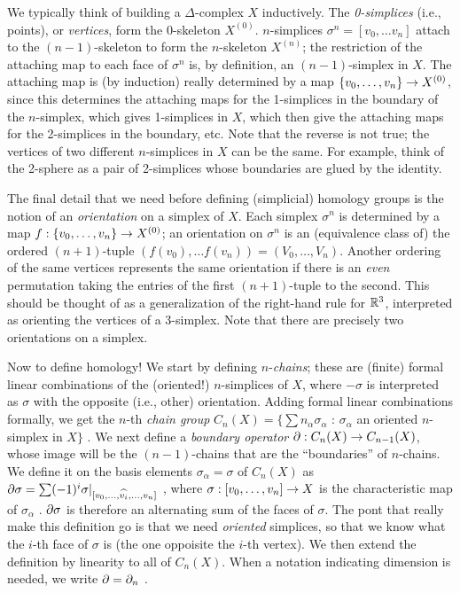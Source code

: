 \msk

We typically think of building a $\Delta$-complex $X$ inductively. 
The {\it 0-simplices}
(i.e., points), or {\it vertices}, form the 0-skeleton 
$X^{(0)}$. $n$-simplices $\sigma^n = [v_0,\ldots v_n]$ attach 
to the $(n-1)$-skeleton
to form the $n$-skeleton $X^{(n)}$; the restriction
of the attaching map to each face of $\sigma^n$ is, by definition,
an $(n-1)$-simplex in $X$. The attaching map is (by induction)
really determined by a map $\{v_0,\ldots ,v_n\}\rightarrow X^{(0)}$, since this 
determines the attaching maps for the 1-simplices in the boundary of the
$n$-simplex, which 
gives 1-simplices in $X$, which then give the attaching maps for
the 2-simplices in the boundary, etc. Note that the reverse is not true;
the vertices of two different $n$-simplices in $X$ can be the same.
For example, think of the 2-sphere as a pair of 2-simplices whose 
boundaries are glued by the identity. 

\msk

The final detail that we need before defining (simplicial) homology
groups is the notion of an {\it orientation} on a simplex of $X$.
Each simplex $\sigma^n$ is determined by a map 
$f:\{v_0,\ldots ,v_n\}\rightarrow X^{(0)}$; an orientation on $\sigma^n$ is an
(equivalence class of) the ordered $(n+1)$-tuple $(f(v_0),\ldots f(v_n)) = (V_0,\ldots ,V_n)$.
Another ordering of the
same vertices represents the same orientation if there is an {\it even} permutation
taking the entries of the first $(n+1)$-tuple to the second. This should be thought 
of as a generalization of the right-hand rule for ${\Bbb R}^3$, interpreted as
orienting the vertices of a 3-simplex. Note that there are precisely two
orientations on a simplex.

\msk

Now to define homology! We start by defining $n$-{\it chains};
these are (finite) formal linear combinations of the (oriented!) $n$-simplices
of $X$, where $-\sigma$ is interpreted as $\sigma$ with the opposite
(i.e., other) orientation. Adding formal linear combinations formally,
we get the $n$-th {\it chain group} 
$C_n(X) = \{\sum n_\alpha \sigma_\alpha$ : $\sigma_\alpha$ an oriented $n$-simplex in $X\}$ .
We next define a {\it boundary operator} $\partial:C_n(X)\rightarrow C_{n-1}(X)$, whose image will be 
the $(n-1)$-chains that are the ``boundaries'' of $n$-chains. We define it on the basis
elements $\sigma_\alpha = \sigma$ of $C_n(X)$ as
$\partial\sigma = \sum (-1)^i\sigma|_{[v_0,\ldots,\widehat{v_{i}},\ldots ,v_n]}$ , 
where $\sigma:[v_0,\ldots ,v_n]\rightarrow X$ is the characteristic map of $\sigma_\alpha$ .
$\partial\sigma$ is therefore an alternating sum of the faces of $\sigma$. 
The pont that really make this definition
go is that we need {\it oriented} simplices, so that we know what the $i$-th face
of $\sigma$ is (the one oppoisite the $i$-th vertex).
We then extend the definition by linearity to all of $C_n(X)$. When a notation indicating
dimension is needed, we write $\partial=\partial_n$ . 

